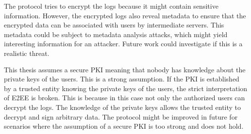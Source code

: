 \documentclass[../main.tex]{subfiles}
\begin{document}
The protocol tries to encrypt the logs because it might contain sensitive information.
However, the encrypted logs also reveal metadata to ensure that the encrypted data can be associated with users by intermediate servers.
This metadata could be subject to metadata analysis attacks, which might yield interesting information for an attacker.
Future work could investigate if this is a realistic threat.

This thesis assumes a secure PKI meaning that nobody has knowledge about the private keys of the users.
This is a strong assumption.
If the PKI is established by a trusted entity knowing the private keys of the users, the strict interpretation of E2EE is broken.
This is because in this case not only the authorized users can decrypt the logs.
The knowledge of the private keys allows the trusted entity to decrypt and sign arbitrary data.
The protocol might be improved in future for scenarios where the assumption of a secure PKI is too strong and does not hold.
\end{document}

